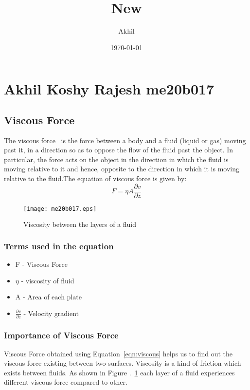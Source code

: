 \documentclass[a4paper, 12pt]{article}
\begin{document}
\title{New}
\author{Akhil}
\date{\today}
\maketitle

\tableofcontents
\listoffigures
\listoftables

\section{Akhil Koshy Rajesh me20b017}
\subsection{Viscous Force}

The viscous force~\cite{zhang} is the force between a body and a fluid (liquid or gas) 
moving past it, in a direction so as to oppose the flow of the fluid past 
the object. In particular, the force acts on the object in the direction in 
which the fluid is moving relative to it and hence, opposite to the 
direction in which it is moving relative to the fluid.The equation of 
viscous force is given by: 
\begin{equation}
F = \eta A \frac{\partial v}{\partial z}
\label{eqn:viscous}
\end{equation}
\begin{figure}[h]
	\begin{center}
		  \texttt{[image: me20b017.eps]}
	\end{center}
\caption{Viscosity between the layers of a fluid}
\label{fig:viscous}
\end{figure}

\subsubsection{Terms used in the equation}
\begin{itemize}
	\item F - Viscous Force
	\item $\eta$ - viscosity of fluid
	\item A - Area of each plate
	\item $\frac{\partial v}{\partial z}$ - Velocity gradient 
\end{itemize}

\subsubsection{Importance of Viscous Force}
Viscous Force obtained using Equation~\ref{eqn:viscous} helps us to find 
out the viscous force existing between two surfaces. Viscosity is a kind 
of friction which exists between fluids. As shown in Figure .~\ref{fig:viscous}
each layer of a fluid experiences different viscous force compared to 
other.


\end{document}
